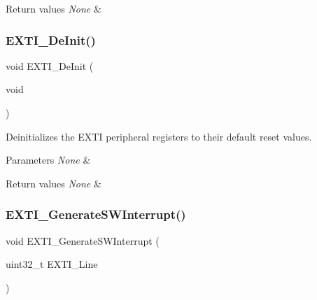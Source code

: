 \begin{DoxyRetVals}{Return values}
{\em None} & \\
\hline
\end{DoxyRetVals}
\mbox{\label{group___e_x_t_i___exported___functions_ga07072e339cb9ecb9cd9d4b94afc9f317}} 
\subsubsection{\texorpdfstring{EXTI\_DeInit()}{EXTI\_DeInit()}}
{\footnotesize\ttfamily void E\+X\+T\+I\+\_\+\+De\+Init (\begin{DoxyParamCaption}\item[{void}]{ }\end{DoxyParamCaption})}



Deinitializes the E\+X\+TI peripheral registers to their default reset values. 


\begin{DoxyParams}{Parameters}
{\em None} & \\
\hline
\end{DoxyParams}

\begin{DoxyRetVals}{Return values}
{\em None} & \\
\hline
\end{DoxyRetVals}
\mbox{\label{group___e_x_t_i___exported___functions_ga897e8ea59f40a19e047fb9994876fc9b}} 
\subsubsection{\texorpdfstring{EXTI\_GenerateSWInterrupt()}{EXTI\_GenerateSWInterrupt()}}
{\footnotesize\ttfamily void E\+X\+T\+I\+\_\+\+Generate\+S\+W\+Interrupt (\begin{DoxyParamCaption}\item[{uint32\+\_\+t}]{E\+X\+T\+I\+\_\+\+Line }\end{DoxyParamCaption})}



